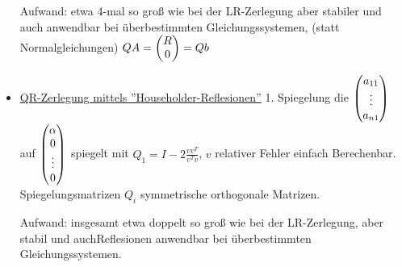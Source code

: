 \documentclass[../Skript.tex]{subfiles}
\begin{document}
\begin{example}[2D]
\begin{itemize}
        \item[Aufwand:] etwa 4-mal so groß wie bei der LR-Zerlegung aber stabiler und auch anwendbar bei überbestimmten Gleichungssystemen, (statt Normalgleichungen) \(QA=\begin{pmatrix}R \\ 0\end{pmatrix} = Qb\)
        
        \item\underline{QR-Zerlegung mittels ''Householder-Reflesionen''} 1. Spiegelung die \(\begin{pmatrix}a_{11} \\ \vdots \\ a_{n1}\end{pmatrix}\) auf 
        \(\begin{pmatrix}\alpha \\ 0 \\ \vdots \\ 0\end{pmatrix}\) spiegelt mit  \(Q_1=I-2\frac{vv^T}{v^Tv}\), \(v\) relativer Fehler einfach Berechenbar. Spiegelungsmatrizen \(Q_i\) symmetrische orthogonale Matrizen.
        \item[Aufwand:] insgesamt etwa doppelt so groß wie bei der LR-Zerlegung, aber stabil und auchReflesionen anwendbar bei überbestimmten Gleichungssystemen.
    \end{itemize}
\end{example}
    
\end{document}
